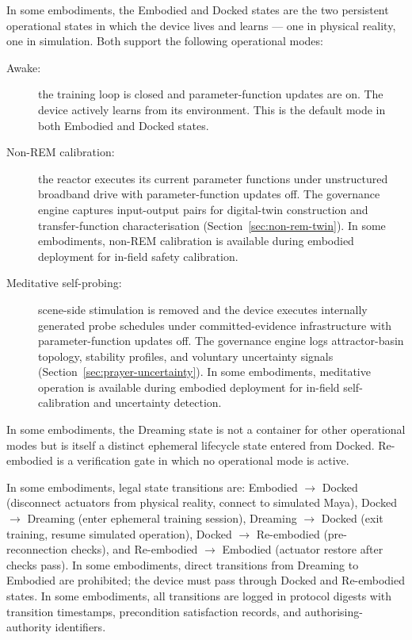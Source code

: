 \documentclass[a4paper,12pt]{article}
\begin{document}
In some embodiments, the Embodied and Docked states are the two
persistent operational states in which the device lives and learns ---
one in physical reality, one in simulation. Both support the following
operational modes:

\begin{description}
  \item[Awake:] the training loop is closed and parameter-function
    updates are on. The device actively learns from its environment.
    This is the default mode in both Embodied and Docked states.
  \item[Non-REM calibration:] the reactor executes its current
    parameter functions under unstructured broadband drive with
    parameter-function updates off. The governance engine captures
    input-output pairs for digital-twin construction and
    transfer-function characterisation
    (Section~\ref{sec:non-rem-twin}). In some embodiments,
    non-REM calibration is available during embodied deployment for
    in-field safety calibration.
  \item[Meditative self-probing:] scene-side stimulation is removed
    and the device executes internally generated probe schedules under
    committed-evidence infrastructure with parameter-function updates
    off. The governance engine logs attractor-basin topology, stability
    profiles, and voluntary uncertainty signals
    (Section~\ref{sec:prayer-uncertainty}). In some embodiments,
    meditative operation is available during embodied deployment for
    in-field self-calibration and uncertainty detection.
\end{description}

In some embodiments, the Dreaming state is not a container for other
operational modes but is itself a distinct ephemeral lifecycle state
entered from Docked. Re-embodied is a verification gate in which no
operational mode is active.

In some embodiments, legal state transitions are:
Embodied $\to$ Docked (disconnect actuators from physical reality,
connect to simulated Maya), Docked $\to$ Dreaming
(enter ephemeral training session),
Dreaming $\to$ Docked (exit training, resume simulated operation),
Docked $\to$ Re-embodied (pre-reconnection checks), and
Re-embodied $\to$ Embodied (actuator restore after checks pass). In
some embodiments, direct transitions from Dreaming to Embodied are
prohibited; the device must pass through Docked and Re-embodied
states. In some embodiments, all transitions are logged in protocol
digests with transition timestamps, precondition satisfaction records,
and authorising-authority identifiers.
\end{document}
